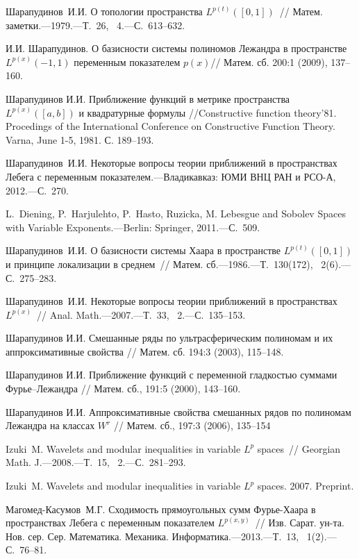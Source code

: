\begin{thebibliography}{1}
Шарапудинов~И.И.
{О топологии пространства $L^{p(t)}([0,1])$~/\!/ Матем. заметки.---1979.---Т.~26, \No~4.---С.~613--632.}

 И.И. Шарапудинов. О базисности системы полиномов
Лежандра в пространстве $L^{p(x)}(-1,1)$  переменным показателем
 $p(x)$// Матем. сб. 200:1 (2009), 137--160.

Шарапудинов И.И. Приближение функций в метрике
пространства $ L^{p(x)}([a,b])$ и квадратурные формулы
//Constructive function theory'81. Procedings of the International
Conference on Constructive Function Theory. Varna, June 1-5, 1981.
С. 189--193.


Шарапудинов~И.И.
{Некоторые вопросы теории приближений в пространствах Лебега с переменным показателем.---Владикавказ: ЮМИ ВНЦ РАН и РСО-А, 2012.---С.~270.}

L.~Diening, P.~Harjulehto, P.~Hasto, Ruzicka, M.
{Lebesgue and Sobolev Spaces with Variable Exponents.---Berlin: Springer, 2011.---С.~509.}

Шарапудинов~И.И.
{О базисности системы Хаара в пространстве $L^{p(t)}([0,1])$ и принципе локализации в среднем~/\!/ Матем. сб.---1986.---Т.~130(172), \No~2(6).---С.~275--283.}

Шарапудинов~И.И.
{Некоторые вопросы теории приближений в пространствах $L^{p(x)}$~/\!/ Anal. Math.---2007.---Т.~33, \No~2.---С.~135--153.}

 Шарапудинов И.И. Смешанные ряды по ультрасферическим  полиномам и их аппроксимативные свойства // Матем. сб. 194:3 (2003), 115--148.

Шарапудинов  И.И. Приближение функций с переменной гладкостью суммами Фурье–Лежандра // Матем. сб., 191:5 (2000), 143–160.

Шарапудинов И.И. Аппроксимативные свойства смешанных рядов по полиномам Лежандра на классах $W^r$ // Матем. сб., 197:3 (2006), 135–154

Izuki~M.
{Wavelets and modular inequalities in variable $L^p$ spaces~/\!/ Georgian Math. J.---2008.---Т.~15, \No~2.---С.~281--293.}

Izuki~M.
{Wavelets and modular inequalities in variable $L^p$ spaces. 2007. Preprint.}

Магомед-Касумов~М.Г.
{Сходимость прямоугольных сумм Фурье-Хаара в пространствах Лебега с переменным показателем $L^{p(x,y)}$~/\!/ Изв. Сарат. ун-та. Нов. сер. Сер. Математика. Механика. Информатика.---2013.---Т.~13, \No~1(2).---С.~76--81.}


\end{thebibliography}
